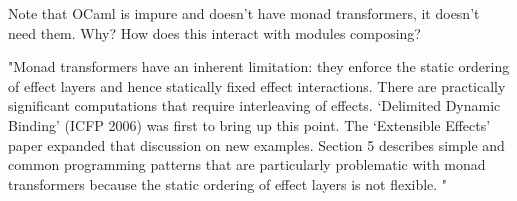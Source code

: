 Note that OCaml is impure and doesn't have monad transformers,
it doesn't need them.
Why?
How does this interact with modules composing?

"Monad transformers have an inherent limitation:
they enforce the static ordering of effect layers and hence statically fixed effect interactions.
There are practically significant computations that require interleaving of effects.
‘Delimited Dynamic Binding’ (ICFP 2006) was first to bring up this point.
The ‘Extensible Effects’ paper expanded that discussion on new examples.
Section 5 describes simple and common programming patterns that are particularly
problematic with monad transformers because the static ordering of effect layers is not flexible.
"
